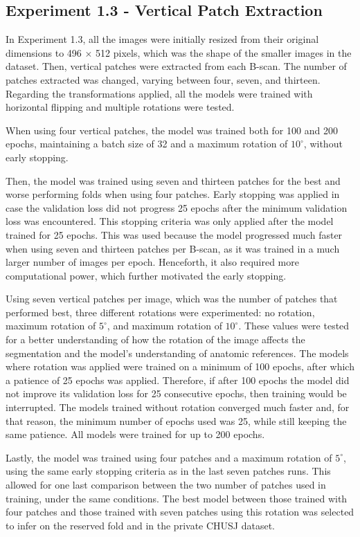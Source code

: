 \subsection{Experiment 1.3 - Vertical Patch Extraction}
In Experiment 1.3, all the images were initially resized from their original dimensions to 496 $\times$ 512 pixels, which was the shape of the smaller images in the dataset. Then, vertical patches were extracted from each B-scan. The number of patches extracted was changed, varying between four, seven, and thirteen. Regarding the transformations applied, all the models were trained with horizontal flipping and multiple rotations were tested.
\par
When using four vertical patches, the model was trained both for 100 and 200 epochs, maintaining a batch size of 32 and a maximum rotation of $10^{\circ}$, without early stopping. 
\par
Then, the model was trained using seven and thirteen patches for the best and worse performing folds when using four patches. Early stopping was applied in case the validation loss did not progress 25 epochs after the minimum validation loss was encountered. This stopping criteria was only applied after the model trained for 25 epochs. This was used because the model progressed much faster when using seven and thirteen patches per B-scan, as it was trained in a much larger number of images per epoch. Henceforth, it also required more computational power, which further motivated the early stopping.
\par
Using seven vertical patches per image, which was the number of patches that performed best, three different rotations were experimented: no rotation, maximum rotation of $5^{\circ}$, and maximum rotation of $10^{\circ}$. These values were tested for a better understanding of how the rotation of the image affects the segmentation and the model's understanding of anatomic references. The models where rotation was applied were trained on a minimum of 100 epochs, after which a patience of 25 epochs was applied. Therefore, if after 100 epochs the model did not improve its validation loss for 25 consecutive epochs, then training would be interrupted. The models trained without rotation converged much faster and, for that reason, the minimum number of epochs used was 25, while still keeping the same patience. All models were trained for up to 200 epochs.
\par
Lastly, the model was trained using four patches and a maximum rotation of $5^{\circ}$, using the same early stopping criteria as in the last seven patches runs. This allowed for one last comparison between the two number of patches used in training, under the same conditions. The best model between those trained with four patches and those trained with seven patches using this rotation was selected to infer on the reserved fold and in the private CHUSJ dataset.

